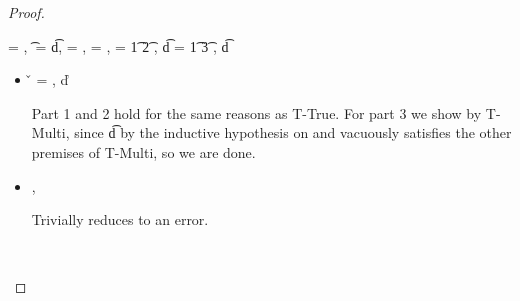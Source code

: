 \begin{lemma}
\begin{proof}
\begin{case}[T-MethodStatic]
\end{case}

\begin{case}[T-DefMulti]
  \e{} = {\createmultiexp {\s{}} {}},
  \t{} = {\MultiFntype {\s{}} {\t{d}}},
  \thenprop{\prop{}} = {\topprop{}},
  \elseprop{\prop{}} = {\botprop{}},
  \s{} = {\ArrowOne {\x{}} {\t{1}} {\t{2}}
                          {
                                      {}}
                          {}},
  \t{d} = {\ArrowOne {\x{}} {\t{1}} {\t{3}}
                          {
                                      {}}
                          {}},
  \judgementtwo {\propenv{}} { {\t{d}}}


\begin{itemize}
  \item[]
\begin{subcase}[B-DefMulti]
  \v{} = { {\emptydisptable}},
  \opsem {\openv{}} {} {\v{d}}


Part 1 and 2 hold for the same reasons as T-True.
For part 3 we show 
by T-Multi, since \judgementtwo {} { {\t{d}}} by the inductive hypothesis on {}
and {\emptydisptable} vacuously satisfies the other premises of T-Multi, so we are done.

\end{subcase}
  \item[]
\begin{subcase}[BE-DefMulti] \opsem {\openv{}} {} {\errorvalv{}},
        \opsem {\openv{}} {\e{}} {\errorvalv{}}

        Trivially reduces to an error.

\end{subcase}
\end{itemize}
\end{case}

\begin{case}[T-DefMethod]
        \ 


\end{case}
\end{proof}
\end{lemma}
